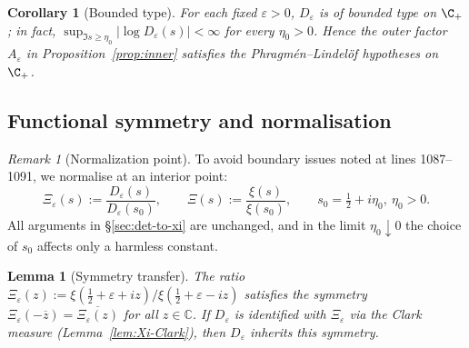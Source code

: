 ﻿\documentclass[12pt,a4paper]{article}
\newtheorem{lemma}[theorem]{Lemma}
\newtheorem{corollary}[theorem]{Corollary}
\theoremstyle{definition}
\theoremstyle{remark}
\newtheorem{remark}[theorem]{Remark}
\newcommand{\CC}{\mathbb{C}}
\begin{document}
\begin{corollary}[Bounded type]\label{cor:bounded-type}
For each fixed $\varepsilon>0$, $D_\varepsilon$ is of bounded type on $\C_+$; in fact, $\sup_{\Im s\ge\eta_0}|\log D_\varepsilon(s)|<\infty$ for every $\eta_0>0$.
Hence the outer factor $A_\varepsilon$ in Proposition~\ref{prop:inner} satisfies the Phragm\'en--Lindel\"of hypotheses on $\C_+$.
\end{corollary}

\subsection{Functional symmetry and normalisation}\label{subsec:sym-norm}
\begin{remark}[Normalization point]\label{rem:norm}
To avoid boundary issues noted at lines 1087--1091, we normalise at an interior point:
\begin{equation}\label{eq:norm-point}
  \Xi_\varepsilon(s):=\frac{D_\varepsilon(s)}{D_\varepsilon(s_0)},\qquad \Xi(s):=\frac{\xi(s)}{\xi(s_0)},\qquad s_0=\tfrac12+i\eta_0,\ \eta_0>0.
\end{equation}
All arguments in \S\ref{sec:det-to-xi} are unchanged, and in the limit $\eta_0\downarrow0$ the choice of $s_0$ affects only a harmless constant.
\end{remark}
\begin{lemma}[Symmetry transfer]\label{lem:sym-transfer}
The ratio $\Xi_\varepsilon(z) := \xi(\tfrac12+\varepsilon+iz)/\xi(\tfrac12+\varepsilon-iz)$ satisfies the symmetry $\Xi_\varepsilon(-\overline{z}) = \overline{\Xi_\varepsilon(z)}$ for all $z \in \CC$. If $D_\varepsilon$ is identified with $\Xi_\varepsilon$ via the Clark measure (Lemma~\ref{lem:Xi-Clark}), then $D_\varepsilon$ inherits this symmetry.
\end{lemma}
\end{document}
